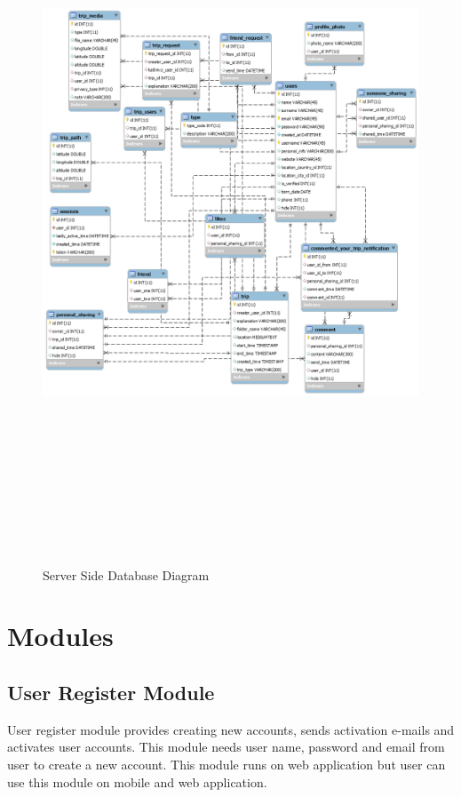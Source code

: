 \begin{figure}[!htbp]
\centering
\includegraphics[width=40em, height=58em]{projectChapters/images/databaseDesign.png}
\caption{Server Side Database Diagram}
\label{fig:roles}
\end{figure}


\newpage
\section{Modules}

\subsection{User Register Module}
User register module provides creating new accounts, sends activation e-mails and activates user accounts. This module needs user name, password and email from user to create a new account. This module runs on web application but user can use this module on mobile and web application.
